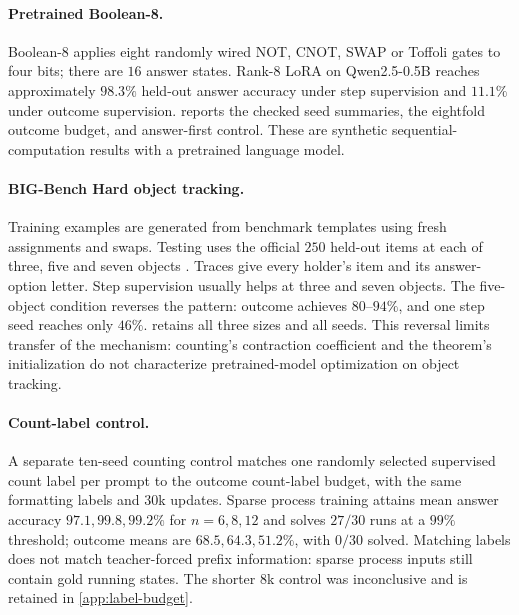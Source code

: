 \paragraph{Pretrained Boolean-8.}
Boolean-8 applies eight randomly wired NOT, CNOT, SWAP or Toffoli gates to four bits; there are $16$ answer states. Rank-$8$ LoRA on Qwen2.5-0.5B \citep{qwen2025qwen25,hu2022lora} reaches approximately $98.3\%$ held-out answer accuracy under step supervision and $11.1\%$ under outcome supervision.  reports the checked seed summaries, the eightfold outcome budget, and answer-first control. These are synthetic sequential-computation results with a pretrained language model.


\paragraph{BIG-Bench Hard object tracking.}
Training examples are generated from benchmark templates using fresh assignments and swaps. Testing uses the official $250$ held-out items at each of three, five and seven objects \citep{suzgun2022challenging}. Traces give every holder's item and its answer-option letter. Step supervision usually helps at three and seven objects. The five-object condition reverses the pattern: outcome achieves $80$--$94\%$, and one step seed reaches only $46\%$.  retains all three sizes and all seeds. This reversal limits transfer of the mechanism: counting's contraction coefficient and the theorem's initialization do not characterize pretrained-model optimization on object tracking.

\paragraph{Count-label control.}
A separate ten-seed counting control matches one randomly selected supervised count label per prompt to the outcome count-label budget, with the same formatting labels and $30$k updates. Sparse process training attains mean answer accuracy $97.1,99.8,99.2\%$ for $n=6,8,12$ and solves $27/30$ runs at a $99\%$ threshold; outcome means are $68.5,64.3,51.2\%$, with $0/30$ solved. Matching labels does not match teacher-forced prefix information: sparse process inputs still contain gold running states. The shorter $8$k control was inconclusive and is retained in \cref{app:label-budget}.


